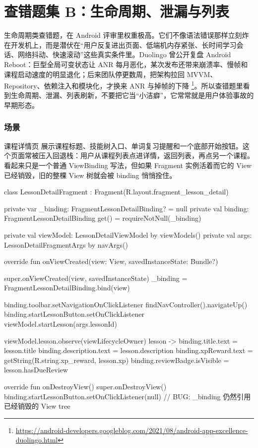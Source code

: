 \chapter{查错题集 B：生命周期、泄漏与列表}

生命周期类查错题，在 Android 评审里权重极高。它们不像语法错误那样立刻炸在开发机上，而是潜伏在“用户反复进出页面、低端机内存紧张、长时间学习会话、网络抖动、快速滚动”这些真实条件里。Duolingo 曾公开复盘 Android Reboot：巨型全局可变状态让 ANR 每月恶化，某次发布还带来崩溃率、慢帧和课程启动速度的明显退化；后来团队停更数周，把架构拉回 MVVM、Repository、依赖注入和模块化，才换来 ANR 与掉帧的下降 \srcofficial\footnote{\url{https://android-developers.googleblog.com/2021/08/android-app-excellence-duolingo.html}}。所以查错题里看到生命周期、泄漏、列表刷新，不要把它当“小洁癖”，它常常就是用户体验事故的早期形态。


\subsection*{场景}
课程详情页  展示课程标题、技能树入口、单词复习提醒和一个底部开始按钮。这个页面常被压入回退栈：用户从课程列表点进详情，返回列表，再点另一个课程。看起来只是一个普通 ViewBinding 写法，但如果 Fragment 实例活着而它的 View 已经销毁，旧的整棵 View 树就会被 binding 悄悄拴住。

\begin{ktbug}
class LessonDetailFragment : Fragment(R.layout.fragment_lesson_detail) {
    private var _binding: FragmentLessonDetailBinding? = null
    private val binding: FragmentLessonDetailBinding
        get() = requireNotNull(_binding)

    private val viewModel: LessonDetailViewModel by viewModels()
    private val args: LessonDetailFragmentArgs by navArgs()

    override fun onViewCreated(view: View, savedInstanceState: Bundle?) {
        super.onViewCreated(view, savedInstanceState)
        _binding = FragmentLessonDetailBinding.bind(view)

        binding.toolbar.setNavigationOnClickListener {
            findNavController().navigateUp()
        }
        binding.startLessonButton.setOnClickListener {
            viewModel.startLesson(args.lessonId)
        }

        viewModel.lesson.observe(viewLifecycleOwner) { lesson ->
            binding.title.text = lesson.title
            binding.description.text = lesson.description
            binding.xpReward.text = getString(R.string.xp_reward, lesson.xp)
            binding.reviewBadge.isVisible = lesson.hasDueReview
        }
    }

    override fun onDestroyView() {
        super.onDestroyView()
        binding.startLessonButton.setOnClickListener(null)
        // BUG: _binding 仍然引用已经销毁的 View tree
    }
}
\end{ktbug}

